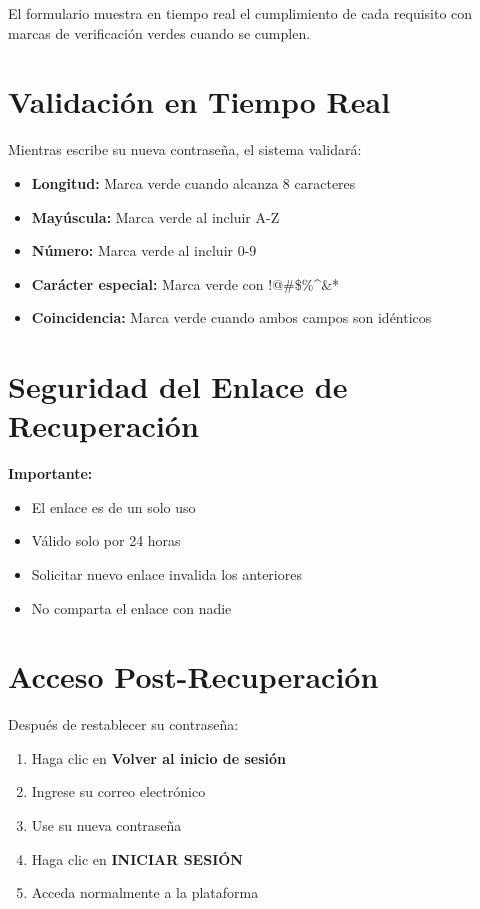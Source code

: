 \documentclass[11pt,a4paper,twoside]{book}
\begin{document}
\begin{notebox}
El formulario muestra en tiempo real el cumplimiento de cada requisito con marcas de verificación verdes cuando se cumplen.
\end{notebox}

\section{Validación en Tiempo Real}

Mientras escribe su nueva contraseña, el sistema validará:

\begin{itemize}
    \item \textbf{Longitud:} Marca verde cuando alcanza 8 caracteres
    \item \textbf{Mayúscula:} Marca verde al incluir A-Z
    \item \textbf{Número:} Marca verde al incluir 0-9
    \item \textbf{Carácter especial:} Marca verde con !@\#\$\%\^{}\&*
    \item \textbf{Coincidencia:} Marca verde cuando ambos campos son idénticos
\end{itemize}

\section{Seguridad del Enlace de Recuperación}

\begin{warningbox}
\textbf{Importante:}
\begin{itemize}
    \item El enlace es de un solo uso
    \item Válido solo por 24 horas
    \item Solicitar nuevo enlace invalida los anteriores
    \item No comparta el enlace con nadie
\end{itemize}
\end{warningbox}

\section{Acceso Post-Recuperación}

Después de restablecer su contraseña:

\begin{enumerate}
    \item Haga clic en \textbf{Volver al inicio de sesión}
    \item Ingrese su correo electrónico
    \item Use su nueva contraseña
    \item Haga clic en \textbf{INICIAR SESIÓN}
    \item Acceda normalmente a la plataforma
\end{enumerate}
\end{document}

